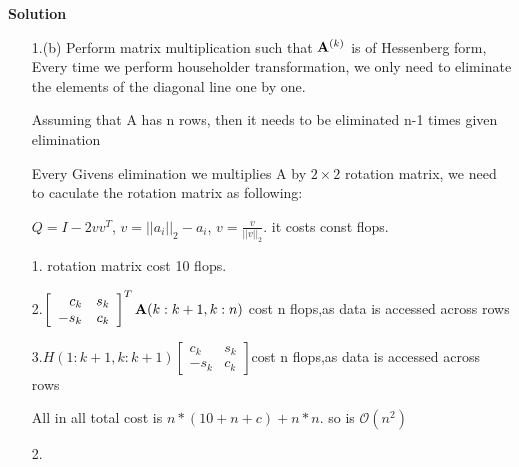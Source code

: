 \documentclass[english,onecolumn]{IEEEtran}
\newcommand{\bigO}{\mathcal{O}}
\newcommand{\bA}{{\bf A}}
\begin{document}
\noindent
\textbf{Solution}
\begin{enumerate}
    \item[1.(b)] Perform matrix multiplication such that $\bA^{(k)}$ is of Hessenberg form, Every time we perform householder transformation, we only need to eliminate the elements of the diagonal line one by one.
    
    Assuming that A has n rows, then it needs to be eliminated n-1 times given elimination
    
    Every Givens elimination we multiplies A by $2 \times 2$ rotation matrix, we need to caculate the rotation matrix as following:
    
    
    $Q = I-2vv^T$, $v = ||a_i||_2-a_i$, $v = \frac{v}{||v||_2}.$  it costs const flops.
    
    1. rotation matrix cost 10 flops.
    
    2.$\left[\begin{array}{rr}
    	c_{k} & s_{k} \\
    	-s_{k} & c_{k}
    \end{array}\right]^T \bA(k: k+1, k: n)$ cost n flops,as data is accessed across rows

   3.$H(1: k+1, k: k+1)\left[\begin{array}{rr}
   	c_{k} & s_{k} \\
   	-s_{k} & c_{k}
   \end{array}\right]$cost n flops,as data is accessed across rows

	All in all total cost is $n*(10 + n + c) + n*n.$  so is $\bigO(n^2)$
    \item[2.]
    
\end{enumerate}
\end{document}
